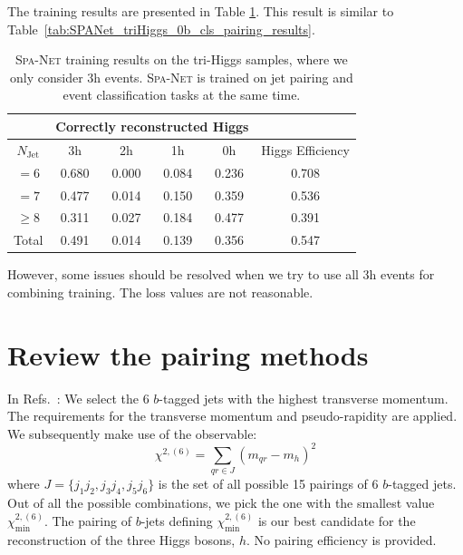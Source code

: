 \documentclass[12pt]{article}
\begin{document}
		The training results are presented in Table \ref{tab:SPANet_triHiggs_0b_3h_cls_pairing_results}. This result is similar to Table~\ref{tab:SPANet_triHiggs_0b_cls_pairing_results}.

		\begin{table}[htpb]
			\centering
			\caption{\textsc{Spa-Net} training results on the tri-Higgs samples, where we only consider 3h events. \textsc{Spa-Net} is trained on jet pairing and event classification tasks at the same time.}
			\label{tab:SPANet_triHiggs_0b_3h_cls_pairing_results}
			\begin{tabular}{c|cccc|c}
			\multicolumn{1}{l|}{} & \multicolumn{4}{c|}{Correctly reconstructed Higgs} & \multicolumn{1}{l}{} \\ \hline
			$N_\text{Jet}$        & 3h          & 2h         & 1h         & 0h         & Higgs Efficiency     \\ \hline
			$=6$                  & 0.680       & 0.000      & 0.084      & 0.236      & 0.708                \\
			$=7$                  & 0.477       & 0.014      & 0.150      & 0.359      & 0.536                \\
			$\ge 8$               & 0.311       & 0.027      & 0.184      & 0.477      & 0.391                \\ \hline
			Total                 & 0.491       & 0.014      & 0.139      & 0.356      & 0.547               
			\end{tabular}
			
		\end{table}

        However, some issues should be resolved when we try to use all 3h events for combining training. The loss values are not reasonable.
\section{Review the pairing methods}%
\label{sec:review_the_pairing_methods}
	In Refs.~\cite{Papaefstathiou:2019ofh, Papaefstathiou:2023uum}: We select the 6 $b$-tagged jets with the highest transverse momentum. The requirements for the transverse momentum and pseudo-rapidity are applied. We subsequently make use of the observable:
	\begin{equation}
		\chi^{2,(6)} = \sum_{qr\in J} (m_{qr} - m_h)^2
	\end{equation}
	where $J = \{j_1j_2,j_3j_4,j_5j_6\} $ is the set of all possible 15 pairings of 6 $b$-tagged jets. Out of all the possible combinations, we pick the one with the smallest value $\chi_{\text{min}}^{2,(6)}$. The pairing of $b$-jets defining $\chi_{\text{min}}^{2,(6)}$ is our best candidate for the reconstruction of the three Higgs bosons, $h$. No pairing efficiency is provided.
\end{document}
